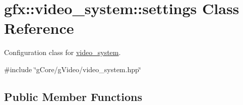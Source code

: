 \hypertarget{classgfx_1_1video__system_1_1settings}{\section{gfx\-:\-:video\-\_\-system\-:\-:settings Class Reference}
\label{classgfx_1_1video__system_1_1settings}
}


Configuration class for \hyperlink{classgfx_1_1video__system}{video\-\_\-system}.  




{\ttfamily \#include \char`\"{}g\-Core/g\-Video/video\-\_\-system.\-hpp\char`\"{}}

\subsection*{Public Member Functions}
